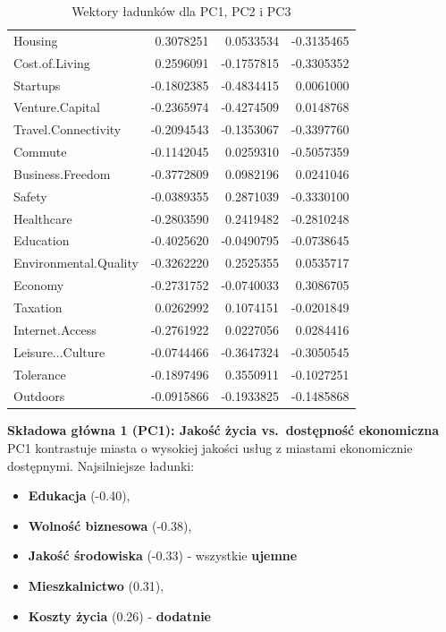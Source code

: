 \documentclass[
  12pt,
]{article}
\providecommand{\tightlist}{%
  \setlength{\itemsep}{0pt}\setlength{\parskip}{0pt}}
\begin{document}
\begin{longtable}[t]{lrrr}
\caption{\label{tab:ladunki}Wektory ładunków dla PC1, PC2 i PC3}\\
\toprule
\cellcolor[HTML]{f2f2f2}{\textbf{}} & \cellcolor[HTML]{f2f2f2}{\textbf{PC1}} & \cellcolor[HTML]{f2f2f2}{\textbf{PC2}} & \cellcolor[HTML]{f2f2f2}{\textbf{PC3}}\\
\midrule
Housing & 0.3078251 & 0.0533534 & -0.3135465\\
Cost.of.Living & 0.2596091 & -0.1757815 & -0.3305352\\
Startups & -0.1802385 & -0.4834415 & 0.0061000\\
Venture.Capital & -0.2365974 & -0.4274509 & 0.0148768\\
Travel.Connectivity & -0.2094543 & -0.1353067 & -0.3397760\\
\addlinespace
Commute & -0.1142045 & 0.0259310 & -0.5057359\\
Business.Freedom & -0.3772809 & 0.0982196 & 0.0241046\\
Safety & -0.0389355 & 0.2871039 & -0.3330100\\
Healthcare & -0.2803590 & 0.2419482 & -0.2810248\\
Education & -0.4025620 & -0.0490795 & -0.0738645\\
\addlinespace
Environmental.Quality & -0.3262220 & 0.2525355 & 0.0535717\\
Economy & -0.2731752 & -0.0740033 & 0.3086705\\
Taxation & 0.0262992 & 0.1074151 & -0.0201849\\
Internet.Access & -0.2761922 & 0.0227056 & 0.0284416\\
Leisure...Culture & -0.0744466 & -0.3647324 & -0.3050545\\
\addlinespace
Tolerance & -0.1897496 & 0.3550911 & -0.1027251\\
Outdoors & -0.0915866 & -0.1933825 & -0.1485868\\
\bottomrule
\end{longtable}

\textbf{Składowa główna 1 (PC1): Jakość życia vs.~dostępność
ekonomiczna}\\
PC1 kontrastuje miasta o wysokiej jakości usług z miastami ekonomicznie
dostępnymi. Najsilniejsze ładunki:

\begin{itemize}
\tightlist
\item
  \textbf{Edukacja} (-0.40),\\
\item
  \textbf{Wolność biznesowa} (-0.38),\\
\item
  \textbf{Jakość środowiska} (-0.33) - wszystkie \textbf{ujemne}\\
\item
  \textbf{Mieszkalnictwo} (0.31),\\
\item
  \textbf{Koszty życia} (0.26) - \textbf{dodatnie}
\end{itemize}
\end{document}
